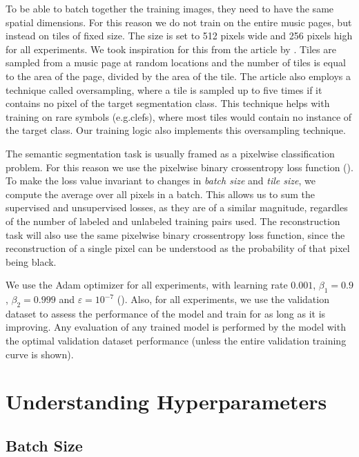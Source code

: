 To be able to batch together the training images, they need to have the same spatial dimensions. For this reason we do not train on the entire music pages, but instead on tiles of fixed size. The size is set to 512 pixels wide and 256 pixels high for all experiments. We took inspiration for this from the article by \cite{HajicEtAl}. Tiles are sampled from a music page at random locations and the number of tiles is equal to the area of the page, divided by the area of the tile. The article also employs a technique called oversampling, where a tile is sampled up to five times if it contains no pixel of the target segmentation class. This technique helps with training on rare symbols (e.g.\@ clefs), where most tiles would contain no instance of the target class. Our training logic also implements this oversampling technique.

The semantic segmentation task is usually framed as a pixelwise classification problem. For this reason we use the pixelwise binary crossentropy loss function (\cite{DeepLearningBook}). To make the loss value invariant to changes in \emph{batch size} and \emph{tile size}, we compute the average over all pixels in a batch. This allows us to sum the supervised and unsupervised losses, as they are of a similar magnitude, regardles of the number of labeled and unlabeled training pairs used. The reconstruction task will also use the same pixelwise binary crossentropy loss function, since the reconstruction of a single pixel can be understood as the probability of that pixel being black.

We use the Adam optimizer for all experiments, with learning rate $0.001$, $\beta_1 = 0.9$, $\beta_2 = 0.999$ and $\varepsilon = 10^{-7}$ (\cite{AdamOptimizer}). Also, for all experiments, we use the validation dataset to assess the performance of the model and train for as long as it is improving. Any evaluation of any trained model is performed by the model with the optimal validation dataset performance (unless the entire validation training curve is shown).


\section{Understanding Hyperparameters}
\label{sec:UnderstandingHyperparameters}


\subsection{Batch Size}
\label{sec:BatchSize}

